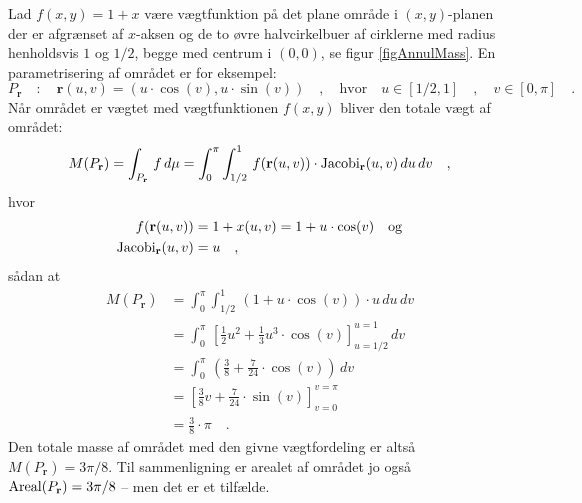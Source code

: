 \begin{example} \label{exampAnnulMass}
Lad $f(x,y) = 1+x$ være vægtfunktion på det plane område i $(x,y)$-planen der er afgrænset af $x$-aksen og de to øvre halvcirkelbuer af cirklerne med radius henholdsvis $1$ og $1/2$, begge med centrum i $(0,0)$, se figur \ref{figAnnulMass}. En parametrisering af området er for eksempel:
\begin{equation}
P_{\mathbf{r}} \quad : \quad \mathbf{r}(u,v) = (u\cdot \cos(v), u\cdot \sin(v)) \quad , \quad \textrm{hvor} \quad u \in [1/2, 1] \quad , \quad v \in [0, \pi] \quad.
\end{equation}
Når området er vægtet med vægtfunktionen $f(x,y)$ bliver den totale vægt af området:
\begin{equation}
M(P_{\mathbf{r}}) = \int_{P_{\mathbf{r}}}\, f\, d\mu = \int_{0}^{\pi}\int_{1/2}^{1} \, f(\mathbf{r}(u,v))\cdot \operatorname{Jacobi}_{\mathbf{r}}(u,v) \, du \, dv \quad ,
\end{equation}
hvor
\begin{equation}
\begin{aligned}
f(\mathbf{r}(u,v)) &= 1 + x(u,v) = 1 + u\cdot \cos(v) \quad \textrm{og} \\
\operatorname{Jacobi}_{\mathbf{r}}(u,v) &= u \quad ,
\end{aligned}
\end{equation}
sådan at
\begin{equation}
\begin{aligned}
M(P_{\mathbf{r}}) &= \int_{0}^{\pi}\int_{1/2}^{1} \,(1 + u\cdot \cos(v))\cdot u \, du \, dv \\
&= \int_{0}^{\pi}\,\left[\frac{1}{2}u^{2} + \frac{1}{3}u^{3}\cdot \cos(v)\right]_{u=1/2}^{u=1} \, dv \\
&= \int_{0}^{\pi}\, \left( \frac{3}{8} + \frac{7}{24}\cdot \cos(v) \right) \, dv \\
&= \left[ \frac{3}{8}v + \frac{7}{24}\cdot \sin(v)\right]_{v=0}^{v=\pi} \\
&= \frac{3}{8}\cdot\pi \quad .
\end{aligned}
\end{equation}
Den totale masse af området med den givne vægtfordeling er altså $M(P_{\mathbf{r}}) = 3\pi/8$. Til sammenligning er arealet af området jo også $\operatorname{Areal}(P_{\mathbf{r}}) = 3\pi/8$ -- men det er et tilfælde.
\end{example}

